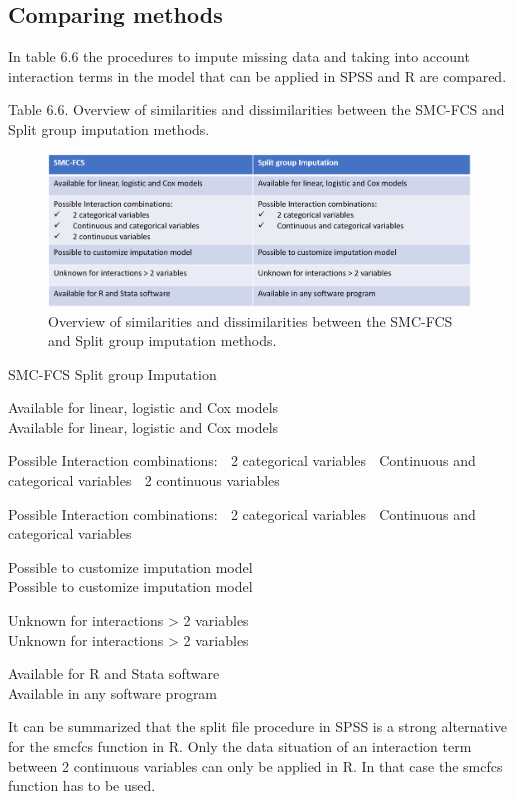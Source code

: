\documentclass[]{book}
\theoremstyle{definition}
\theoremstyle{definition}
\theoremstyle{definition}
\theoremstyle{remark}
\begin{document}
\subsection{Comparing methods}\label{comparing-methods}

In table 6.6 the procedures to impute missing data and taking into
account interaction terms in the model that can be applied in SPSS and R
are compared.

Table 6.6. Overview of similarities and dissimilarities between the
SMC-FCS and Split group imputation methods.

\begin{figure}

{\centering \includegraphics[width=0.9\linewidth]{images/tab6.6} 

}

\caption{Overview of similarities and dissimilarities between the SMC-FCS and Split group imputation methods.}\label{fig:tab6-6}
\end{figure}

SMC-FCS Split group Imputation

Available for linear, logistic and Cox models\\
Available for linear, logistic and Cox models

Possible Interaction combinations:  2 categorical variables 
Continuous and categorical variables  2 continuous variables

Possible Interaction combinations:  2 categorical variables 
Continuous and categorical variables

Possible to customize imputation model\\
Possible to customize imputation model

Unknown for interactions \textgreater{} 2 variables\\
Unknown for interactions \textgreater{} 2 variables

Available for R and Stata software\\
Available in any software program

It can be summarized that the split file procedure in SPSS is a strong
alternative for the smcfcs function in R. Only the data situation of an
interaction term between 2 continuous variables can only be applied in
R. In that case the smcfcs function has to be used.
\end{document}

